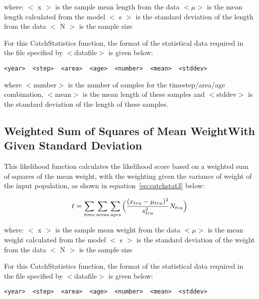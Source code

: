 \documentclass[10pt,twoside]{book}
\begin{document}
where:\newline
$<$ x $>$ is the sample mean length from the data\newline
$<\mu>$ is the mean length calculated from the model\newline
$<$ s $>$ is the standard deviation of the length from the data\newline
$<$ N $>$ is the sample size

\bigskip
For this CatchStatistics function, the format of the statistical data required in the file specified by $<$datafile$>$ is given below:

{\small\begin{verbatim}
<year>  <step>  <area>  <age>  <number>  <mean>  <stddev>
\end{verbatim}}

where $<$number$>$ is the number of samples for the timestep/area/age combination, $<$mean$>$ is the mean length of these samples and $<$stddev$>$ is the standard deviation of the length of these samples.

\subsection{Weighted Sum of Squares of Mean Weight\newline With Given Standard Deviation}
This likelihood function calculates the likelihood score based on a weighted sum of squares of the mean weight, with the weighting given the variance of weight of the input population, as shown in equation~\ref{eq:catchstat3} below:

\begin{equation}\label{eq:catchstat3}
\ell = \sum_{\it time}\sum_{\it areas}\sum_{\it ages} \Big(\frac{(x_{tra}-\mu_{tra})^2} {s_{tra}^2} N_{tra}\Big)
\end{equation}

where:\newline
$<$ x $>$ is the sample mean weight from the data\newline
$<\mu>$ is the mean weight calculated from the model\newline
$<$ s $>$ is the standard deviation of the weight from the data\newline
$<$ N $>$ is the sample size

\newpage %
For this CatchStatistics function, the format of the statistical data required in the file specified by $<$datafile$>$ is given below:

{\small\begin{verbatim}
<year>  <step>  <area>  <age>  <number>  <mean>  <stddev>
\end{verbatim}}
\end{document}
